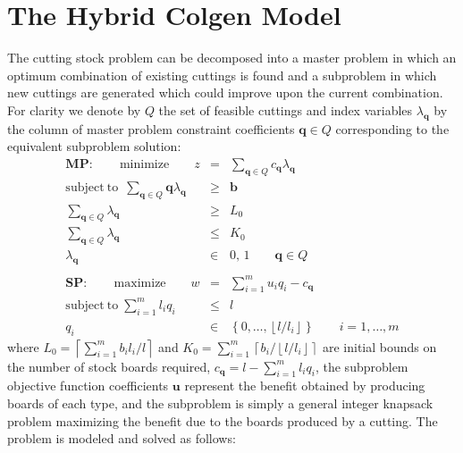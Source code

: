 \section{The Hybrid Colgen Model}
The cutting stock problem can be decomposed into a master problem in which an optimum combination of existing cuttings is found and a subproblem in which new cuttings are generated which could improve upon the current combination. For clarity we denote by $Q$ the set of feasible cuttings and index variables $\lambda_{\mathbf{q}}$ by the column of master problem constraint coefficients $\mathbf{q}\in Q$ corresponding to the equivalent subproblem solution:
\begin{displaymath}
\begin{array}{rcl}
\mathbf{MP:}\qquad\mathrm{minimize}\qquad z&=&\sum_{\mathbf{q}\in Q}c_{\mathbf{q}}\lambda_{\mathbf{q}}\\
\mathrm{subject\ to}\;\ \sum_{\mathbf{q}\in Q}\mathbf{q}\lambda_{\mathbf{q}}&\geq&\mathbf{b}\\
\sum_{\mathbf{q}\in Q}\lambda_{\mathbf{q}}&\geq&L_{0}\\
\sum_{\mathbf{q}\in Q}\lambda_{\mathbf{q}}&\leq&K_{0}\\
\lambda_{\mathbf{q}}&\in&{0,\,1}\qquad\mathbf{q}\in Q\\
&&\\
\mathbf{SP:}\qquad\mathrm{maximize}\qquad w&=&\sum_{i=1}^{m}{u_{i}q_{i}}-c_{\mathbf{q}}\\
\mathrm{subject\ to}\;\sum_{i=1}^{m}{l_{i}q_{i}}&\leq&l\\
q_{i}&\in&\left\{0,\ldots,\left\lfloor l/l_{i}\right\rfloor\right\}\qquad i=1,\ldots,m
\end{array}
\end{displaymath}
where $L_{0}=\left\lceil\sum_{i=1}^{m}b_{i}l_{i}/l\right\rceil$ and $K_{0}=\sum_{i=1}^{m}\left\lceil b_{i}/\left\lfloor l/l_{i}\right\rfloor\right\rceil$ are initial bounds on the number of stock boards required, $c_{\mathbf{q}}=l-\sum_{i=1}^{m}{l_{i}q_{i}}$, the subproblem objective function coefficients $\mathbf{u}$ represent the benefit obtained by producing boards of each type, and the subproblem is simply a general integer knapsack problem maximizing the benefit due to the boards produced by a cutting. The problem is modeled and solved as follows:
